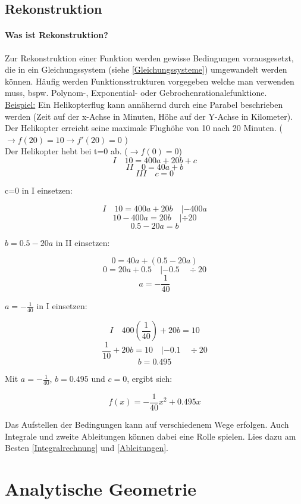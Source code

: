 \documentclass{article}
\begin{document}
	\subsection{Rekonstruktion}\label{Rekonstruktion}
		\paragraph{Was ist Rekonstruktion?}
			Zur Rekonstruktion einer Funktion werden gewisse Bedingungen vorausgesetzt, die in ein Gleichungssystem (siehe \ref{Gleichungssysteme}) umgewandelt werden können. Häufig werden Funktionsstrukturen vorgegeben welche man verwenden muss, bspw. Polynom-, Exponential- oder Gebrochenrationalefunktione. \\
			\underline{Beispiel:} Ein Helikopterflug kann annähernd durch eine Parabel beschrieben werden (Zeit auf der x-Achse in Minuten, Höhe auf der Y-Achse in Kilometer). \\
			Der Helikopter erreicht seine maximale Flughöhe von 10 nach 20 Minuten. ( $ \rightarrow f(20)=10 \rightarrow f'(20)=0 $ ) \\
			Der Helikopter hebt bei t=0 ab. ($ \rightarrow f(0)=0$) \\
			
			\[ I \quad 10=400a+20b+c \]
			\[ II \quad 0=40a+b \]
			\[ III \quad c=0 \]
			
			c=0 in I einsetzen:
			
			\[I \quad 10=400a+20b \quad |-400a \]
			\[ 10-400a=20b \quad | \div 20\]
			\[ 0.5-20a=b\]
			
			$b= 0.5-20a $ in II einsetzen:
			
			\[ 0=40a+(0.5-20a)\]
			\[ 0=20a+0.5 \quad |-0.5 \quad \div 20\]
			\[ a=-\frac{1}{40} \]
			
			$a=-\frac{1}{40}$ in I einsetzen:
			
			\[ I \quad 400(\frac{1}{40})+20b=10 \]
			\[ \frac{1}{10}+20b=10 \quad |-0.1 \quad \div 20\]
			\[ b=0.495\]
			
			Mit $a=-\frac{1}{40}$, $b=0.495$ und $c=0$, ergibt sich:
			
			\[f(x)=-\frac{1}{40}x^2+0.495x\]
			
			Das Aufstellen der Bedingungen kann auf verschiedenem Wege erfolgen. Auch Integrale und zweite Ableitungen können dabei eine Rolle spielen.
			Lies dazu am Besten \ref{Integralrechnung} und \ref{Ableitungen}.
		
\section{Analytische Geometrie}
\end{document}

